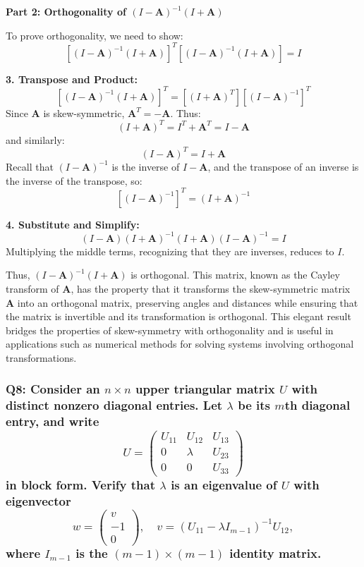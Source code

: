 \documentclass[8pt]{article}
\begin{document}
\textbf{Part 2: Orthogonality of \((I - \mathbf{A})^{-1}(I + \mathbf{A})\)}

To prove orthogonality, we need to show:
\[
\left[(I - \mathbf{A})^{-1}(I + \mathbf{A})\right]^T \left[(I - \mathbf{A})^{-1}(I + \mathbf{A})\right] = I
\]

\textbf{3. Transpose and Product:}
   \[
   \left[(I - \mathbf{A})^{-1}(I + \mathbf{A})\right]^T = \left[(I + \mathbf{A})^T \right] \left[(I - \mathbf{A})^{-1}\right]^T
   \]
   Since \(\mathbf{A}\) is skew-symmetric, \(\mathbf{A}^T = -\mathbf{A}\). Thus:
   \[
   (I + \mathbf{A})^T = I^T + \mathbf{A}^T = I - \mathbf{A}
   \]
   and similarly:
   \[
   (I - \mathbf{A})^T = I + \mathbf{A}
   \]
   Recall that \((I - \mathbf{A})^{-1}\) is the inverse of \(I - \mathbf{A}\), and the transpose of an inverse is the inverse of the transpose, so:
   \[
   \left[(I - \mathbf{A})^{-1}\right]^T = (I + \mathbf{A})^{-1}
   \]

\textbf{4. Substitute and Simplify:}
   \[
   (I - \mathbf{A}) (I + \mathbf{A})^{-1} (I + \mathbf{A}) (I - \mathbf{A})^{-1} = I
   \]
   Multiplying the middle terms, recognizing that they are inverses, reduces to \(I\).

Thus, \((I - \mathbf{A})^{-1}(I + \mathbf{A})\) is orthogonal. This matrix, known as the Cayley transform of \(\mathbf{A}\), has the property that it transforms the skew-symmetric matrix \(\mathbf{A}\) into an orthogonal matrix, preserving angles and distances while ensuring that the matrix is invertible and its transformation is orthogonal. This elegant result bridges the properties of skew-symmetry with orthogonality and is useful in applications such as numerical methods for solving systems involving orthogonal transformations.

\subsubsection*{Q8: Consider an \(n \times n\) upper triangular matrix \(U\) with distinct nonzero diagonal entries. Let \(\lambda\) be its \(m\)th diagonal entry, and write
\[
U = \begin{pmatrix}
U_{11} & U_{12} & U_{13} \\
0 & \lambda & U_{23} \\
0 & 0 & U_{33}
\end{pmatrix}
\]
in block form. Verify that \(\lambda\) is an eigenvalue of \(U\) with eigenvector
\[
w = \begin{pmatrix}
v \\
-1 \\
0
\end{pmatrix}, \quad v = (U_{11} - \lambda I_{m-1})^{-1} U_{12},
\]
where \(I_{m-1}\) is the \((m - 1) \times (m - 1)\) identity matrix.}
\end{document}
